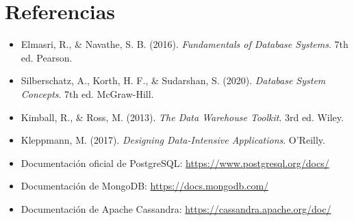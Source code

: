 \documentclass[12pt,a4paper,openany,oneside]{book}
\begin{document}
\chapter*{Referencias}
\begin{itemize}
    \item Elmasri, R., \& Navathe, S. B. (2016). \textit{Fundamentals of Database Systems}. 7th ed. Pearson.
    \item Silberschatz, A., Korth, H. F., \& Sudarshan, S. (2020). \textit{Database System Concepts}. 7th ed. McGraw-Hill.
    \item Kimball, R., \& Ross, M. (2013). \textit{The Data Warehouse Toolkit}. 3rd ed. Wiley.
    \item Kleppmann, M. (2017). \textit{Designing Data-Intensive Applications}. O'Reilly.
    \item Documentación oficial de PostgreSQL: \url{https://www.postgresql.org/docs/}
    \item Documentación de MongoDB: \url{https://docs.mongodb.com/}
    \item Documentación de Apache Cassandra: \url{https://cassandra.apache.org/doc/}
\end{itemize}
\end{document}
